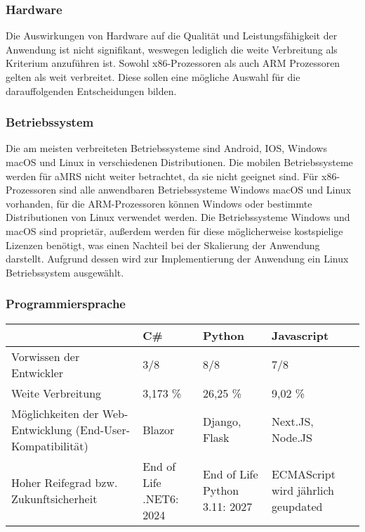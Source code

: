 \subsubsection*{Hardware}
Die Auswirkungen von Hardware auf die Qualität und Leistungsfähigkeit der Anwendung ist nicht signifikant, weswegen lediglich die weite Verbreitung als Kriterium anzuführen ist.
Sowohl x86-Prozessoren als auch ARM Prozessoren gelten als weit verbreitet.
Diese sollen eine mögliche Auswahl für die darauffolgenden Entscheidungen bilden.
\subsubsection*{Betriebssystem}
Die am meisten verbreiteten Betriebssysteme sind Android, IOS, Windows macOS und Linux in verschiedenen Distributionen.
Die mobilen Betriebssysteme werden für \ac{aMRS} nicht weiter betrachtet, da sie nicht geeignet sind.
Für x86-Prozessoren sind alle anwendbaren Betriebssysteme Windows macOS und Linux vorhanden, für die ARM-Prozessoren können Windows oder bestimmte Distributionen von Linux verwendet werden.
Die Betriebssysteme Windows und macOS sind proprietär, außerdem werden für diese möglicherweise kostspielige Lizenzen benötigt, was einen Nachteil bei der Skalierung der Anwendung darstellt.
Aufgrund dessen wird zur Implementierung der Anwendung ein Linux Betriebssystem ausgewählt.

\subsubsection*{Programmiersprache}

\begin{tabular} {|m{3cm}|m{3cm}|m{3cm}|m{3cm}|}
\hline
 & C\# & Python & Javascript \\
\hline
Vorwissen der Entwickler & 3/8 & 8/8 & 7/8 \\
\hline
Weite Verbreitung & 3,173 \% & 26,25 \% & 9,02 \% \\
\hline
Möglichkeiten der Web-Entwicklung (End-User-Kompatibilität) & Blazor & Django, Flask & Next.JS, Node.JS \\
\hline
Hoher Reifegrad bzw. Zukunftsicherheit & End of Life .NET6: 2024 & End of Life Python 3.11: 2027 & ECMAScript wird jährlich geupdated \\
\hline
\end{tabular}


